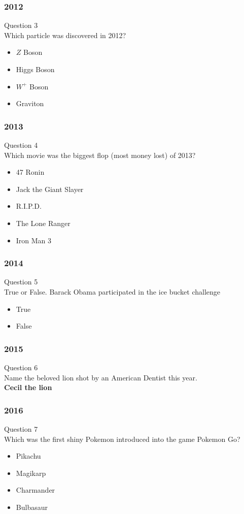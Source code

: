 \documentclass{beamer}
\begin{document}
\begin{frame}
\frametitle{2012}
Question 3\\
Which particle was discovered in 2012?
\begin{itemize}

\item $Z$ Boson
\item Higgs Boson \checkmark
\item $W^+$ Boson
\item Graviton
\end{itemize}


\end{frame}



\begin{frame}
\frametitle{2013}
Question 4\\
Which movie was the biggest flop (most money lost) of 2013?
\begin{itemize}

\item 47 Ronin
\item Jack the Giant Slayer
\item R.I.P.D.
\item The Lone Ranger \checkmark
\item Iron Man 3
\end{itemize}
\end{frame}

\begin{frame}
\frametitle{2014}
Question 5\\
True or False. Barack Obama participated in the ice bucket challenge
\begin{itemize}

\item True
\item False \checkmark
\end{itemize}
\end{frame}


\begin{frame}
\frametitle{2015}
Question 6\\
Name the beloved lion shot by an American Dentist this year.\\
\textbf{Cecil the lion}
\end{frame}

\begin{frame}
\frametitle{2016}
Question 7\\
Which was the first shiny Pokemon introduced into the game Pokemon Go?

\begin{itemize}
\item Pikachu
\item Magikarp \checkmark
\item Charmander
\item Bulbasaur
\end{itemize}
\end{frame}
\end{document}
